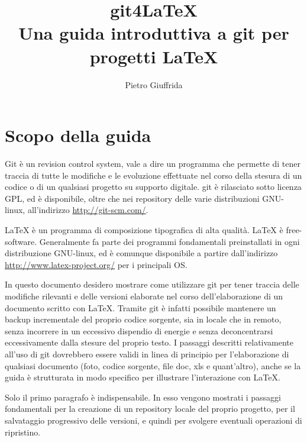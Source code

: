 \documentclass[a4paper,12pt,oneside]{article}
\begin{document}

\title{git4\LaTeX \\
  Una guida introduttiva a git per progetti \LaTeX}
\author{Pietro Giuffrida}
\maketitle
\newpage
\tableofcontents
\newpage
\section{Scopo della guida}
Git è un revision control system, vale a dire un programma che permette di
tener traccia di tutte le modifiche e le evoluzione effettuate nel corso della
stesura di un codice o di un qualsiasi progetto su supporto digitale. git è
rilasciato sotto licenza GPL, ed è disponibile, oltre che nei repository delle
varie distribuzioni GNU-linux, all'indirizzo \url{http://git-scm.com/}.

\LaTeX{} è un programma di composizione tipografica di alta qualità. \LaTeX{} è
free-software. Generalmente fa parte dei programmi fondamentali preinstallati in
ogni distribuzione GNU-linux, ed è comunque disponibile a partire dall'indirizzo
\url{http://www.latex-project.org/} per i principali OS.

In questo documento desidero mostrare come utilizzare git per tener traccia
delle modifiche rilevanti e delle versioni elaborate nel corso dell'elaborazione
di un documento scritto con \LaTeX. Tramite git è infatti possibile mantenere un
backup incrementale del proprio codice sorgente, sia in locale che in remoto,
senza incorrere in un eccessivo dispendio di energie e senza deconcentrarsi
eccessivamente dalla stesure del proprio testo. I passaggi descritti
relativamente all'uso di git dovrebbero essere validi in linea di principio per
l'elaborazione di qualsiasi documento (foto, codice sorgente, file doc, xls
e quant'altro), anche se la guida è strutturata in modo specifico per
illustrare l'interazione con \LaTeX.

Solo il primo paragrafo è indispensabile. In esso vengono mostrati i passaggi
fondamentali per la creazione di un repository locale del proprio progetto, per
il salvataggio progressivo delle versioni, e quindi per svolgere eventuali
operazioni di ripristino.
\end{document}
